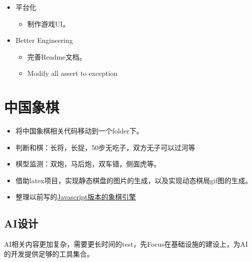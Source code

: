\documentclass[export, 12pt, letterpaper]{ctexrep}
\begin{document}
\begin{itemize}
\item{ 平台化
\begin{itemize}
\item{ 制作游戏UI。 }
\end{itemize}
 }
\item{ Better Engineering
\begin{itemize}
\item{ 完善Readme文档。 }
\item{ Modify all assert to exception }
\end{itemize}
 }
\end{itemize}


\section{中国象棋}


\begin{itemize}
\item{ 将中国象棋相关代码移动到一个folder下。 }
\item{ 判断和棋：长将，长捉，50步无吃子，双方无子可以过河等 }
\item{ 棋型监测：双炮，马后炮，双车错，侧面虎等。 }
\item{ 借助latex项目，实现静态棋盘的图片的生成，以及实现动态棋局gif图的生成。 }
\item{ 整理以前写的\href{https://github.com/JimmyFromSYSU/ChineseChess}{Javascript版本的象棋引擎} }
\end{itemize}


\subsection{AI设计}

AI相关内容更加复杂，需要更长时间的test，先Focus在基础设施的建设上，为AI的开发提供足够的工具集合。
\end{document}

